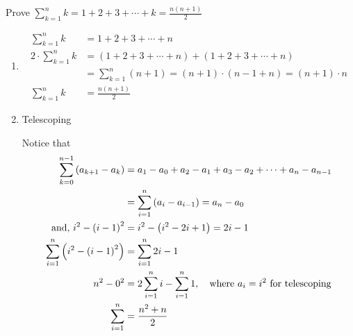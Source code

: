 \documentclass{article}
\begin{document}
Prove $ \sum_{k = 1}^{n} k = 1 + 2 + 3 + \cdots + k = \frac{ n(n + 1) }{ 2 } $
\begin{enumerate}[label = \textbf{Method \arabic*:}]
	\item
	      \begin{align*}
		      \sum_{k = 1}^{n} k         & = 1 + 2 + 3 + \cdots + n                                                                                                     \\
		      2 \cdot \sum_{k = 1}^{n} k & = \left( 1 + 2 + 3 + \cdots + n \right) + \left( 1 + 2 + 3 + \cdots + n \right)                                              \\
		                                 & = \sum_{k = 1}^{n} \left( n + 1 \right) = \left( n + 1 \right) \cdot \left( n - 1 + n \right) = \left( n + 1 \right) \cdot n \\
		      \sum_{k = 1}^{n} k         & = \frac{ n \left( n + 1 \right) }{ 2 }
	      \end{align*}

	\item Telescoping

	      Notice that
	      \begin{align*}
		      \sum_{k = 0}^{n - 1} \left( a_{k + 1} - a_{k} \right)        & = a_1 - a_0 + a_2 - a_1 + a_3 - a_2 + \cdots + a_{n} - a_{n - 1}                              \\
		                                                                   & = \sum_{i = 1}^{n} \left( a_{i} - a_{i - 1} \right) = a_n - a_0                               \\
		      \text{and, } i^2 - \left( i - 1 \right)^{2}                  & = i^2 - \left( i^2 - 2i + 1 \right) = 2i - 1                                                  \\
		      \sum_{i = 1}^{n} \left( i^2 - \left( i - 1 \right)^2 \right) & = \sum_{i = 1}^{n} 2i - 1                                                                     \\
		      n^2 - 0^2                                                    & = 2 \sum_{i = 1}^{n} i - \sum_{i = 1}^{n} 1, \quad \text{where $ a_i = i^2 $ for telescoping} \\
		      \sum_{i = 1}^{n}                                             & = \frac{ n^2 + n }{ 2 }
	      \end{align*}
\end{enumerate}
\end{document}
